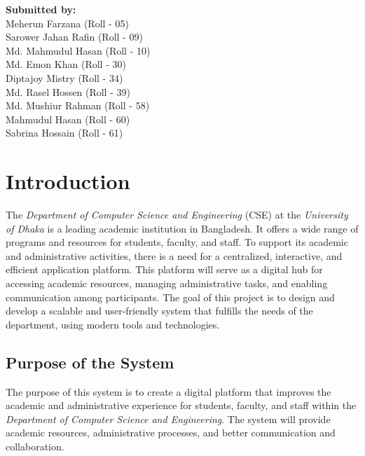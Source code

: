 \documentclass[11pt]{article}
\begin{document}
\begin{titlepage}
    \vspace{5cm}

    \begin{center}   
        \begin{Large}
            \textbf{Submitted by:\\[12pt]}
            Meherun Farzana (Roll - 05) \\
            Sarower Jahan Rafin (Roll - 09) \\
            Md. Mahmudul Hasan (Roll - 10) \\
            Md. Emon Khan (Roll - 30) \\
            Diptajoy Mistry (Roll - 34) \\
            Md. Rasel Hossen (Roll - 39) \\
            Md. Mushiur Rahman (Roll - 58) \\
            Mahmudul Hasan (Roll - 60) \\
            Sabrina Hossain (Roll - 61) \\
        \end{Large}
    \end{center}

\end{titlepage}
\newpage

\tableofcontents
\newpage

\section{Introduction}
The \textit{Department of Computer Science and Engineering} (CSE) at the \textit{University of Dhaka} is a leading academic institution in Bangladesh. It offers a wide range of programs and resources for students, faculty, and staff. To support its academic and administrative activities, there is a need for a centralized, interactive, and efficient application platform. This platform will serve as a digital hub for accessing academic resources, managing administrative tasks, and enabling communication among participants. The goal of this project is to design and develop a scalable and user-friendly system that fulfills the needs of the department, using modern tools and technologies.

\subsection{Purpose of the System}
The purpose of this system is to create a digital platform that improves the academic and administrative experience for students, faculty, and staff within the \textit{Department of Computer Science and Engineering}. The system will provide academic resources, administrative processes, and better communication and collaboration.
\end{document}
